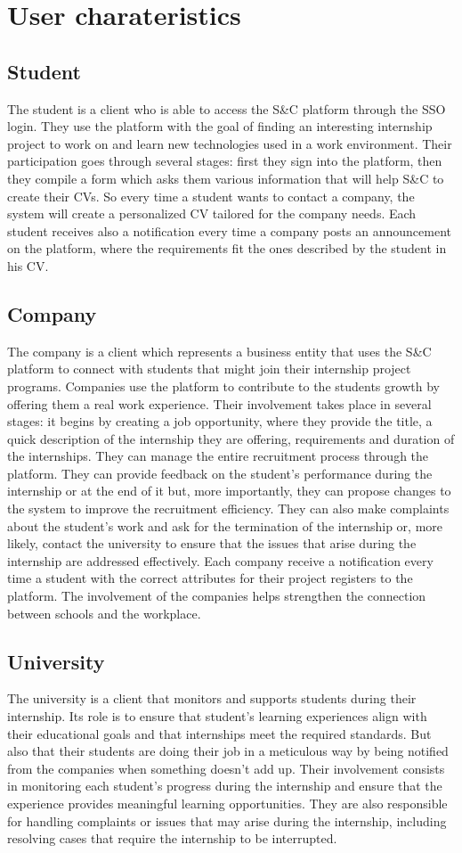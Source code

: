 \section{User charateristics}
\subsection{Student}
The student is a client who is able to access the S\&C platform through the SSO login. They use the platform with the goal of finding an interesting internship project to work on and learn new technologies used in a work environment. Their participation goes through several stages: first they sign into the platform, then they compile a form which asks them various information that will help S\&C to create their CVs. So every time a student wants to contact a company, the system will create a personalized CV tailored for the company needs. Each student receives also a notification every time a company posts an announcement on the platform, where the requirements fit the ones described by the student in his CV.
\subsection{Company}
The company is a client which represents a business entity that uses the S\&C platform to connect with students that might join their internship project programs. Companies use the platform to contribute to the students growth by offering them a real work experience. Their involvement takes place in several stages: it begins by creating a job opportunity, where they provide the title, a quick description of the internship they are offering, requirements and duration of the internships. They can manage the entire recruitment process through the platform. They can provide feedback on the student’s performance during the internship or at the end of it but, more importantly, they can propose changes to the system to improve the recruitment efficiency. They can also make complaints about the student’s work and ask for the termination of the internship or, more likely, contact the university to ensure that the issues that arise during the internship are addressed effectively. Each company receive a notification every time a student with the correct attributes for their project registers to the platform. The involvement of the companies helps strengthen the connection between schools and the workplace.
\subsection{University}
The university is a client that monitors and supports students during their internship. Its role is to ensure that student's learning experiences align with their educational goals and that internships meet the required standards. But also that their students are doing their job in a meticulous way by being notified from the companies when something doesn’t add up. Their involvement consists in  monitoring each student's progress during the internship and ensure that the experience provides meaningful learning opportunities. They are also responsible for handling complaints or issues that may arise during the internship, including resolving cases that require the internship to be interrupted.
